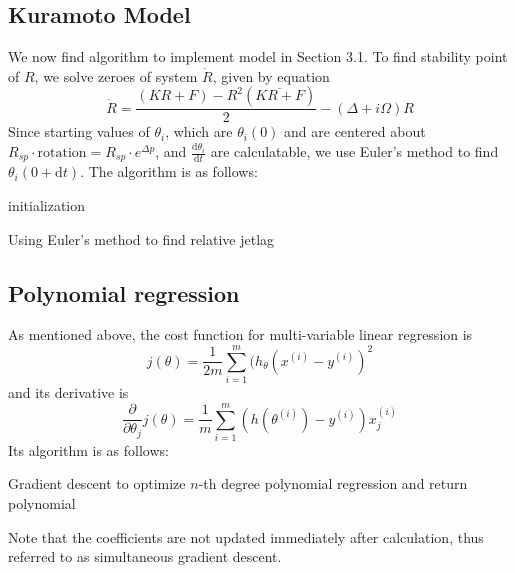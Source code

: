 \subsection{Kuramoto Model}
We now find algorithm to implement model in Section 3.1. To find stability point of $R$, we solve zeroes of system $\dot{R}$, given by equation
$$\dot{R} = \frac{(KR + F) - R^{2} (\overline{KR + F})}{2} - (\Delta + i\Omega)R$$
Since starting values of $\theta_i$, which are $\theta_i(0)$ and are centered about $R_{sp} \cdot \mathrm{rotation} = R_{sp} \cdot e^{\Delta{p}}$, and $\frac{\mathrm{d} \theta_i}{\mathrm{d} t}$ are calculatable, we use Euler's method to find $\theta_i(0 + \mathrm{d}t)$. 
The algorithm is as follows:
\begin{center}
\begin{algorithm}[h]
\SetAlgoLined
{}

 \;
 initialization\;
 \;
 \;
 \caption{Using Euler's method to find relative jetlag}
\end{algorithm}
\end{center}
\subsection{Polynomial regression}
As mentioned above, the cost function for multi-variable linear regression is
$$j(\theta) = \frac{1}{2m} \sum_{i = 1}^{m} (h_{\theta}(x^{(i)} - y^{(i)})^2$$
and its derivative is
$$\frac{\partial}{\partial \theta_j} j(\theta) = \frac{1}{m} \sum_{i=1}^m (h(\theta^{(i)}) - y^{(i)})x_j^{(i)}$$
Its algorithm is as follows:
\newpage
\begin{algorithm}[H]
	\SetAlgoLined
	\caption{Gradient descent to optimize $n$-th degree polynomial regression and return polynomial}
	\SetKwInOut{Input}{input}
	
	\;
\end{algorithm}
Note that the coefficients are not updated immediately after calculation, thus referred to as simultaneous gradient descent.

